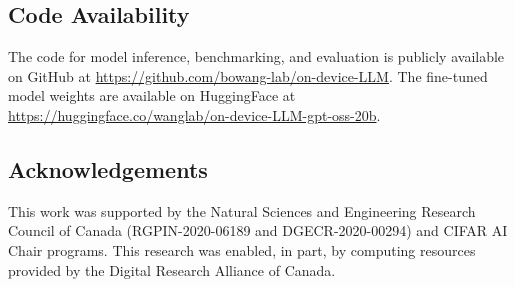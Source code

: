 \documentclass[10pt,journal,compsoc, onecolumn]{IEEEtran}
\begin{document}
\subsection*{Code Availability}
The code for model inference, benchmarking, and evaluation is publicly available on GitHub at \url{https://github.com/bowang-lab/on-device-LLM}. The fine-tuned model weights are available on HuggingFace at \url{https://huggingface.co/wanglab/on-device-LLM-gpt-oss-20b}.

\subsection*{Acknowledgements} 
This work was supported by the Natural Sciences and Engineering Research Council of Canada (RGPIN-2020-06189 and DGECR-2020-00294) and CIFAR AI Chair programs. This research was enabled, in part, by computing resources provided by the Digital Research Alliance of Canada. 



















\end{document}
